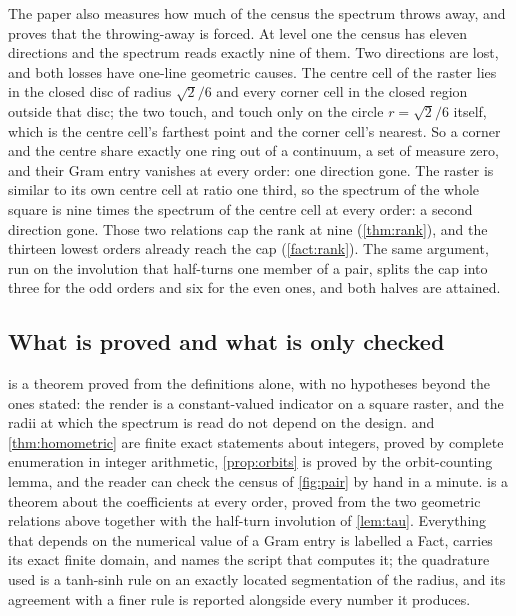 \documentclass[11pt]{amsart}
\theoremstyle{definition}
\theoremstyle{remark}
\begin{document}
The paper also measures how much of the census the spectrum throws away, and proves that the throwing-away is forced. At level one the census has eleven directions and the spectrum reads exactly nine of them. Two directions are lost, and both losses have one-line geometric causes. The centre cell of the raster lies in the closed disc of radius $\sqrt2/6$ and every corner cell in the closed region outside that disc; the two touch, and touch only on the circle $r = \sqrt2/6$ itself, which is the centre cell's farthest point and the corner cell's nearest. So a corner and the centre share exactly one ring out of a continuum, a set of measure zero, and their Gram entry vanishes at every order: one direction gone. The raster is similar to its own centre cell at ratio one third, so the spectrum of the whole square is nine times the spectrum of the centre cell at every order: a second direction gone. Those two relations cap the rank at nine (\cref{thm:rank}), and the thirteen lowest orders already reach the cap (\cref{fact:rank}). The same argument, run on the involution that half-turns one member of a pair, splits the cap into three for the odd orders and six for the even ones, and both halves are attained.

\subsection{What is proved and what is only checked}
\label{sec:roadmap}

 is a theorem proved from the definitions alone, with no hypotheses beyond the ones stated: the render is a constant-valued indicator on a square raster, and the radii at which the spectrum is read do not depend on the design.  and \cref{thm:homometric} are finite exact statements about integers, proved by complete enumeration in integer arithmetic, \cref{prop:orbits} is proved by the orbit-counting lemma, and the reader can check the census of \cref{fig:pair} by hand in a minute.  is a theorem about the coefficients at every order, proved from the two geometric relations above together with the half-turn involution of \cref{lem:tau}. Everything that depends on the numerical value of a Gram entry is labelled a Fact, carries its exact finite domain, and names the script that computes it; the quadrature used is a tanh-sinh rule on an exactly located segmentation of the radius, and its agreement with a finer rule is reported alongside every number it produces.
\end{document}
